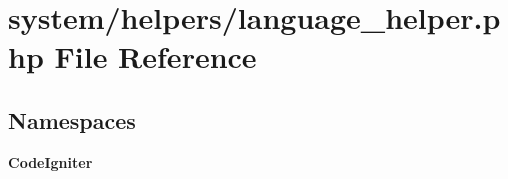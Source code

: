 \section{system/helpers/language\-\_\-helper.php File Reference}
\label{language__helper_8php}
\subsection*{Namespaces}
\begin{DoxyCompactItemize}
\item 
{\bf Code\-Igniter}
\end{DoxyCompactItemize}
